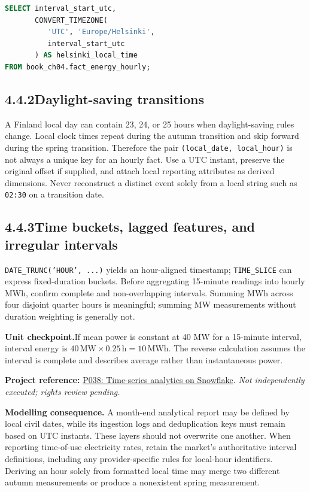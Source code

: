 \documentclass[11pt,twoside]{article}
\newcommand{\topic}[2]{\subsection*{#1\quad #2}}
\newcommand{\repo}[2]{\par\begingroup\fontsize{8.0}{9.6}\selectfont\sffamily\color{inkgray}\textbf{Project reference:} \href{#2}{#1}. \textit{Not independently executed; rights review pending.}\par\endgroup}
\begin{document}
\begin{lstlisting}[language=SQL,caption={Convert an explicitly UTC wall-clock timestamp.}]
SELECT interval_start_utc,
       CONVERT_TIMEZONE(
          'UTC', 'Europe/Helsinki',
          interval_start_utc
       ) AS helsinki_local_time
FROM book_ch04.fact_energy_hourly;
\end{lstlisting}

\topic{4.4.2}{Daylight-saving transitions}
A Finland local day can contain 23, 24, or 25 hours when daylight-saving rules change. Local clock times repeat during the autumn transition and skip forward during the spring transition. Therefore the pair \texttt{(local\_date, local\_hour)} is not always a unique key for an hourly fact. Use a UTC instant, preserve the original offset if supplied, and attach local reporting attributes as derived dimensions. Never reconstruct a distinct event solely from a local string such as \texttt{02:30} on a transition date.

\topic{4.4.3}{Time buckets, lagged features, and irregular intervals}
\texttt{DATE\_TRUNC('HOUR', ...)} yields an hour-aligned timestamp; \texttt{TIME\_SLICE} can express fixed-duration buckets. Before aggregating 15-minute readings into hourly MWh, confirm complete and non-overlapping intervals. Summing MWh across four disjoint quarter hours is meaningful; summing MW measurements without duration weighting is generally not.

\begin{insight}\textbf{Unit checkpoint.}\quad If mean power is constant at 40 MW for a 15-minute interval, interval energy is \(40\,\mathrm{MW}\times 0.25\,\mathrm{h}=10\,\mathrm{MWh}\). The reverse calculation assumes the interval is complete and describes average rather than instantaneous power.\end{insight}
\repo{P038: Time-series analytics on Snowflake}{https://github.com/Snowflake-Labs/sfguide-getting-started-with-time-series-analytics-with-pricing-data-on-snowflake}


\textbf{Modelling consequence.} A month-end analytical report may be defined by local civil dates, while its ingestion logs and deduplication keys must remain based on UTC instants. These layers should not overwrite one another. When reporting time-of-use electricity rates, retain the market's authoritative interval definitions, including any provider-specific rules for local-hour identifiers. Deriving an hour solely from formatted local time may merge two different autumn measurements or produce a nonexistent spring measurement.
\end{document}
